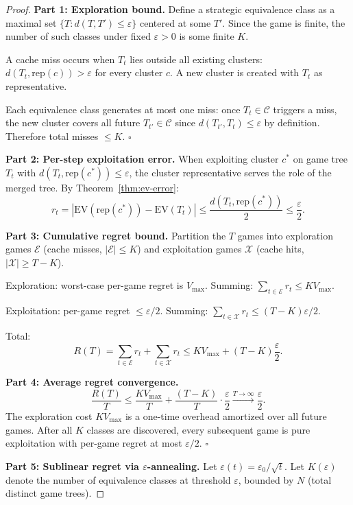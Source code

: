 \documentclass[11pt]{article}
\newcommand{\EV}{\mathrm{EV}}
\newcommand{\rep}{\mathrm{rep}}
\newcommand{\calC}{\mathcal{C}}
\newcommand{\calE}{\mathcal{E}}
\newcommand{\calX}{\mathcal{X}}
\begin{document}
\begin{proof}

\noindent\textbf{Part 1: Exploration bound.}
Define a strategic equivalence class as a maximal set $\{T : d(T, T')
\le \varepsilon\}$ centered at some $T'$. Since the game is finite, the
number of such classes under fixed $\varepsilon > 0$ is some finite $K$.

A cache miss occurs when $T_t$ lies outside all existing clusters:
$d(T_t, \rep(c)) > \varepsilon$ for every cluster $c$. A new cluster is
created with $T_t$ as representative.

Each equivalence class generates at most one miss: once $T_t \in \calC$
triggers a miss, the new cluster covers all future $T_{t'} \in \calC$
since $d(T_{t'}, T_t) \le \varepsilon$ by definition. Therefore total
misses $\le K$. \hfill$\square$

\noindent\textbf{Part 2: Per-step exploitation error.}
When exploiting cluster $c^*$ on game tree $T_t$ with $d(T_t, \rep(c^*))
\le \varepsilon$, the cluster representative serves the role of the
merged tree. By Theorem~\ref{thm:ev-error}:
\[
  r_t = |\EV(\rep(c^*)) - \EV(T_t)| \le \frac{d(T_t, \rep(c^*))}{2}
  \le \frac{\varepsilon}{2}.
\]

\noindent\textbf{Part 3: Cumulative regret bound.}
Partition the $T$ games into exploration games $\calE$ (cache misses,
$|\calE| \le K$) and exploitation games $\calX$ (cache hits, $|\calX|
\ge T - K$).

Exploration: worst-case per-game regret is $V_{\max}$. Summing:
$\sum_{t \in \calE} r_t \le K V_{\max}$.

Exploitation: per-game regret $\le \varepsilon/2$. Summing:
$\sum_{t \in \calX} r_t \le (T - K)\varepsilon/2$.

Total:
\[
  R(T) = \sum_{t \in \calE} r_t + \sum_{t \in \calX} r_t \le K V_{\max}
  + (T - K)\frac{\varepsilon}{2}.
\]

\noindent\textbf{Part 4: Average regret convergence.}
\[
  \frac{R(T)}{T} \le \frac{K V_{\max}}{T} + \frac{(T-K)}{T} \cdot
  \frac{\varepsilon}{2} \xrightarrow{T \to \infty} \frac{\varepsilon}{2}.
\]
The exploration cost $K V_{\max}$ is a one-time overhead amortized over
all future games. After all $K$ classes are discovered, every subsequent
game is pure exploitation with per-game regret at most
$\varepsilon/2$. \hfill$\square$

\noindent\textbf{Part 5: Sublinear regret via $\varepsilon$-annealing.}
Let $\varepsilon(t) = \varepsilon_0 / \sqrt{t}$. Let $K(\varepsilon)$
denote the number of equivalence classes at threshold $\varepsilon$,
bounded by $N$ (total distinct game trees).


\end{proof}
\end{document}

